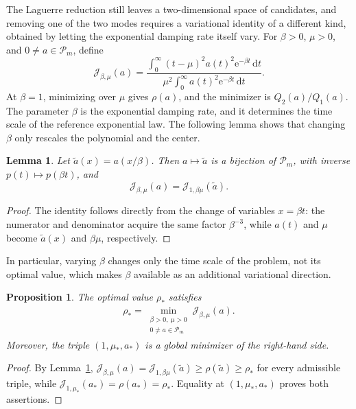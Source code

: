 \documentclass[11pt]{article}
\numberwithin{equation}{section}
\newtheorem{proposition}[theorem]{Proposition}
\newtheorem{lemma}[theorem]{Lemma}
\theoremstyle{definition}
\theoremstyle{remark}
\newcommand{\Pcal}{\mathcal P}
\newcommand{\dd}{\,\mathrm d}
\newcommand{\e}{\mathrm e}
\begin{document}
The Laguerre reduction still leaves a two-dimensional space of candidates, and removing one of the two modes requires a variational identity of a different kind, obtained by letting the exponential damping rate itself vary. For \(\beta>0\), \(\mu>0\), and \(0\neq a\in\Pcal_m\), define
\begin{equation*}
    \mathcal J_{\beta,\mu}(a)
    =\frac{\displaystyle
      \int_0^\infty (t-\mu)^2 a(t)^2\e^{-\beta t}\dd t}
    {\displaystyle
      \mu^2\int_0^\infty a(t)^2\e^{-\beta t}\dd t}.
\end{equation*}
At \(\beta=1\), minimizing over \(\mu\) gives \(\rho(a)\), and the minimizer is \(Q_2(a)/Q_1(a)\). The parameter \(\beta\) is the exponential damping rate, and it determines the time scale of the reference exponential law. The following lemma shows that changing $\beta$ only rescales the
polynomial and the center.

\begin{lemma}\label{rig:lem:dilation}
Let \(\widetilde a(x)=a(x/\beta)\). Then \(a\mapsto\widetilde a\) is a bijection of \(\Pcal_m\), with inverse \(p(t)\mapsto p(\beta t)\), and
\begin{equation*}
    \mathcal J_{\beta,\mu}(a)
    =\mathcal J_{1,\beta\mu}(\widetilde a).
\end{equation*}
\end{lemma}
\begin{proof}
The identity follows directly from the change of variables $x=\beta t$: the
numerator and denominator acquire the same factor $\beta^{-3}$, while $a(t)$
and $\mu$ become $\widetilde a(x)$ and $\beta\mu$, respectively.
\end{proof}


In particular, varying $\beta$ changes only the time scale of the problem,
not its optimal value, which makes $\beta$ available as an additional
variational direction.

\begin{proposition}\label{rig:prop:joint-min}
The optimal value \(\rho_*\) satisfies
\begin{align*}
    \rho_*
    =\min_{\substack{\beta>0,\ \mu>0\\0\neq a\in\Pcal_m}}
      \mathcal J_{\beta,\mu}(a).
\end{align*}
Moreover, the triple \((1,\mu_*,a_*)\) is a global minimizer of the right-hand side.
\end{proposition}

\begin{proof}
By Lemma~\ref{rig:lem:dilation}, \(\mathcal J_{\beta,\mu}(a)=\mathcal J_{1,\beta\mu}(\widetilde a)\geq\rho(\widetilde a)\geq\rho_*\) for every admissible triple, while \(\mathcal J_{1,\mu_*}(a_*)=\rho(a_*)=\rho_*\). Equality at \((1,\mu_*,a_*)\) proves both assertions.
\end{proof}
\end{document}
